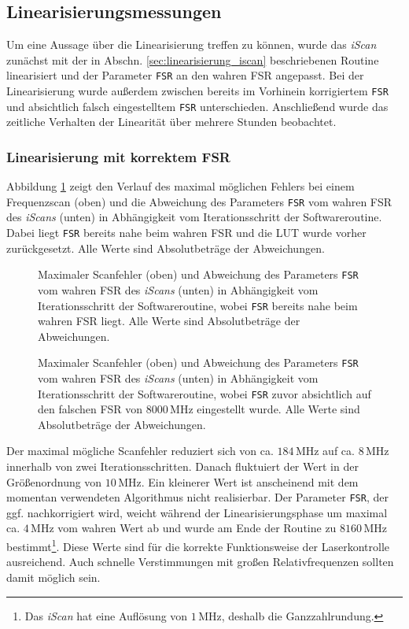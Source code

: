 \subsection{Linearisierungsmessungen}\label{sec:linearisierungsmessungen}
Um eine Aussage über die Linearisierung treffen zu können, wurde das
\textit{iScan} zunächst mit der in Abschn. \ref{sec:linearisierung_iscan}
beschriebenen Routine linearisiert und der Parameter \lstinline|FSR| an den wahren FSR
angepasst. Bei der Linearisierung wurde außerdem
zwischen bereits im Vorhinein korrigiertem \lstinline|FSR| und absichtlich
falsch eingestelltem \lstinline|FSR| unterschieden. Anschließend wurde das
zeitliche Verhalten der Linearität über mehrere Stunden beobachtet.

\subsubsection{Linearisierung mit korrektem
FSR}\label{subsubsec:linearisierung_FSR_okay}
Abbildung \ref{fig:linearisierung_FSR_okay} zeigt den Verlauf des maximal
möglichen Fehlers bei einem Frequenzscan (oben) und die Abweichung des
Parameters \lstinline|FSR| vom wahren FSR des \textit{iScans} (unten) in Abhängigkeit vom Iterationsschritt der Softwareroutine. Dabei liegt \lstinline|FSR| bereits nahe beim wahren FSR und
die LUT wurde vorher zurückgesetzt. Alle Werte sind Absolutbeträge der
Abweichungen.
\begin{figure}[h]
 	\centering
 	\footnotesize
	
	\caption[Linearisierung \textit{iScan}, FSR okay]{Maximaler Scanfehler (oben)
	und Abweichung des Parameters \lstinline|FSR| vom wahren FSR des
	\textit{iScans} (unten) in Abhängigkeit vom Iterationsschritt der
	Softwareroutine, wobei \lstinline|FSR| bereits nahe beim wahren FSR liegt. Alle
	Werte sind Absolutbeträge der Abweichungen.}
	\label{fig:linearisierung_FSR_okay}
\end{figure}
\begin{figure}[h]
 	\centering
 	\footnotesize
	
	\caption[Linearisierung \textit{iScan}, FSR korrigiert]{Maximaler
	Scanfehler (oben) und Abweichung des Parameters \lstinline|FSR| vom wahren
	FSR des \textit{iScans} (unten) in Abhängigkeit vom Iterationsschritt der
	Softwareroutine, wobei \lstinline|FSR| zuvor absichtlich auf den falschen FSR
	von $8000\,$MHz eingestellt wurde. Alle Werte sind Absolutbeträge der Abweichungen.}
	\label{fig:linearisierung_FSR_korr}
\end{figure}
Der maximal mögliche Scanfehler reduziert sich von
ca. $184\,$MHz auf ca. $8\,$MHz innerhalb von zwei Iterationsschritten. Danach
fluktuiert der Wert in der Größenordnung von $10\,$MHz. Ein kleinerer Wert ist
anscheinend mit dem momentan verwendeten Algorithmus nicht realisierbar. Der
Parameter \lstinline|FSR|, der ggf. nachkorrigiert wird, weicht
während der Linearisierungsphase um maximal ca. $4\,$MHz vom wahren Wert ab und
wurde am Ende der Routine zu $8160\,$MHz bestimmt\footnote{Das \textit{iScan}
hat eine Auflösung von $1\,$MHz, deshalb die Ganzzahlrundung.}. Diese Werte sind
für die korrekte Funktionsweise der Laserkontrolle ausreichend. Auch schnelle Verstimmungen mit großen
Relativfrequenzen sollten damit möglich sein.

